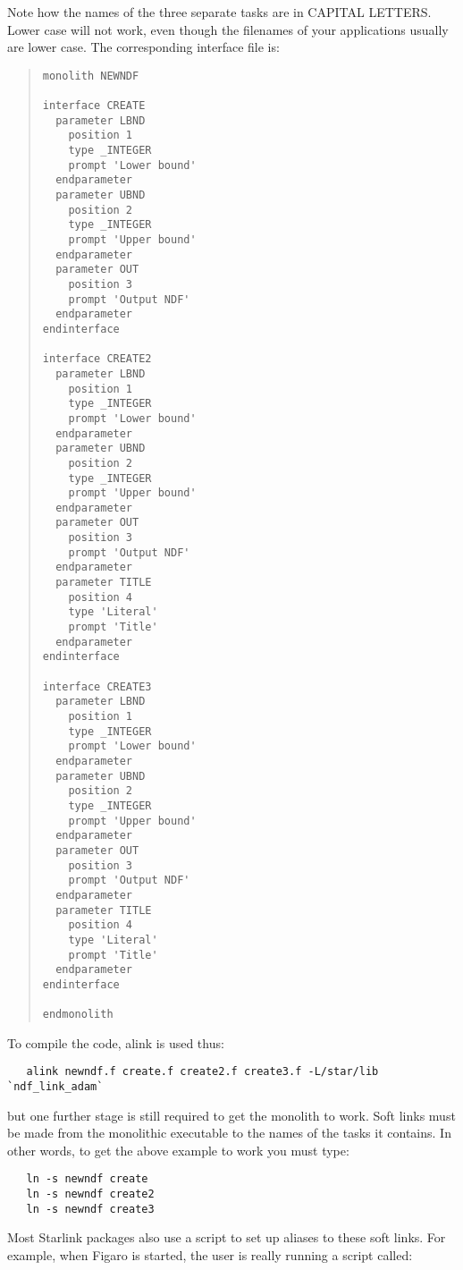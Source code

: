 Note how the names of the three separate tasks are in CAPITAL LETTERS. 
Lower case will not work, even though the filenames of your applications
usually are lower case. The corresponding interface file is:

\begin{quote}
{\small
\begin{verbatim}
monolith NEWNDF

interface CREATE
  parameter LBND
    position 1
    type _INTEGER
    prompt 'Lower bound'
  endparameter
  parameter UBND
    position 2
    type _INTEGER
    prompt 'Upper bound'
  endparameter
  parameter OUT
    position 3
    prompt 'Output NDF'
  endparameter
endinterface

interface CREATE2
  parameter LBND
    position 1
    type _INTEGER
    prompt 'Lower bound'
  endparameter
  parameter UBND
    position 2
    type _INTEGER
    prompt 'Upper bound'
  endparameter
  parameter OUT
    position 3
    prompt 'Output NDF'
  endparameter
  parameter TITLE
    position 4
    type 'Literal'
    prompt 'Title'
  endparameter
endinterface

interface CREATE3
  parameter LBND
    position 1
    type _INTEGER
    prompt 'Lower bound'
  endparameter
  parameter UBND
    position 2
    type _INTEGER
    prompt 'Upper bound'
  endparameter
  parameter OUT
    position 3
    prompt 'Output NDF'
  endparameter
  parameter TITLE
    position 4
    type 'Literal'
    prompt 'Title'
  endparameter
endinterface

endmonolith    
\end{verbatim}
}
\end{quote}

To compile the code, {\sf alink} is used thus:

\begin{verbatim}
   alink newndf.f create.f create2.f create3.f -L/star/lib `ndf_link_adam`  
\end{verbatim}

but one further stage is still required to get the monolith to work. Soft 
links must be made from the monolithic executable to the names of the 
tasks it contains. In other words, to get the above example to work you 
must type:

\begin{verbatim}
   ln -s newndf create
   ln -s newndf create2
   ln -s newndf create3
\end{verbatim}

Most Starlink packages also use a script to set up aliases to these 
soft links. For example, when Figaro is started, the user is really 
running a script called:

